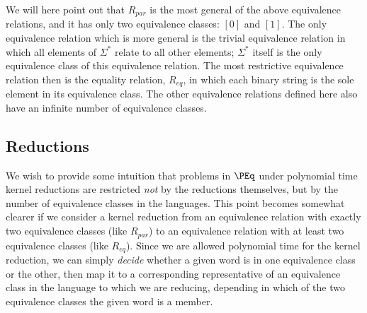 \documentclass{article}
\theoremstyle{definition} \newtheorem{definition}[definition]{Definition}
\newcommand{\sigmastar}{\Sigma^{*}} %
\begin{document}
We will here point out that $R_{par}$ is the most general of the above
equivalence relations, and it has only two equivalence classes: $[0]$ and
$[1]$. The only equivalence relation which is more general is the trivial
equivalence relation in which all elements of $\sigmastar$ relate to all other
elements; $\sigmastar$ itself is the only equivalence class of this equivalence
relation. The most restrictive equivalence relation then is the equality
relation, $R_{eq}$, in which each binary string is the sole element in its
equivalence class. The other equivalence relations defined here also have an
infinite number of equivalence classes.

\subsection{Reductions}

We wish to provide some intuition that problems in $\PEq$ under polynomial time
kernel reductions are restricted \emph{not} by the reductions themselves, but
by the number of equivalence classes in the languages. This point becomes
somewhat clearer if we consider a kernel reduction from an equivalence relation
with exactly two equivalence classes (like $R_{par}$) to an equivalence
relation with at least two equivalence classes (like $R_{eq}$). Since we are
allowed polynomial time for the kernel reduction, we can simply \emph{decide}
whether a given word is in one equivalence class or the other, then map it to a
corresponding representative of an equivalence class in the language to which
we are reducing, depending in which of the two equivalence classes the given
word is a member.
\end{document}
